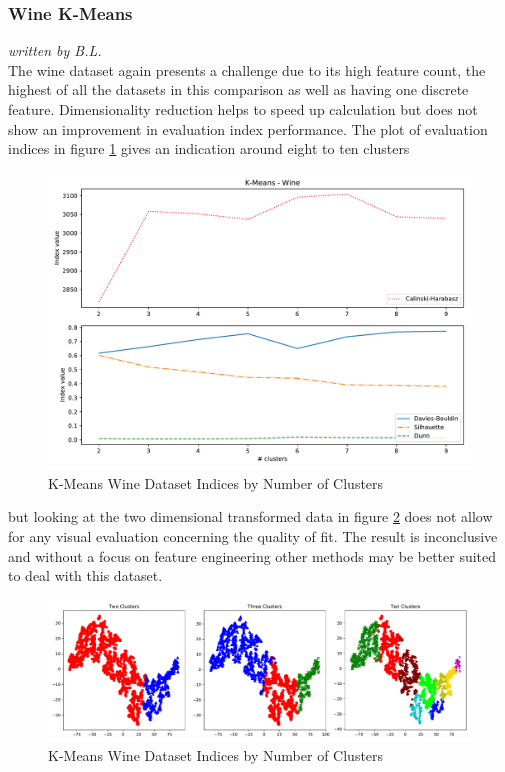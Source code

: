 \subsubsection{Wine K-Means}
\textit{written by B.L.}\\

The wine dataset again presents a challenge due to its high feature count, the highest of all the datasets in this comparison as well as having one discrete feature. Dimensionality reduction helps to speed up calculation but does not show an improvement in evaluation index performance. The plot of evaluation indices in figure \ref{fig:kmeans_wine_indices_comparison} gives an indication around eight to ten clusters

\begin{figure}[h]
\caption{K-Means Wine Dataset Indices by Number of Clusters}
\begin{center}
\includegraphics[width=1.0\textwidth]{images/kmeans_wine_index_plot.pdf}
\end{center}
\label{fig:kmeans_wine_indices_comparison}
\end{figure}

but looking at the two dimensional transformed data in figure \ref{fig:kmeans_wine_tsne} does not allow for any visual evaluation concerning the quality of fit. The result is inconclusive and without a focus on feature engineering other methods may be better suited to deal with this dataset.

\begin{figure}[h]
\caption{K-Means Wine Dataset Indices by Number of Clusters}
\begin{center}
\includegraphics[width=1.0\textwidth]{images/kmeans_wine_tsne.pdf}
\end{center}
\label{fig:kmeans_wine_tsne}
\end{figure}



